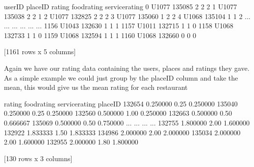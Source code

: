 \documentclass[letterpaper,10pt,english]{jupyterBook}
\begin{document}
\begin{sphinxVerbatim}[commandchars=\\\{\}]
     userID  placeID  rating  food\PYGZus{}rating  service\PYGZus{}rating
0     U1077   135085       2            2               2
1     U1077   135038       2            2               1
2     U1077   132825       2            2               2
3     U1077   135060       1            2               2
4     U1068   135104       1            1               2
...     ...      ...     ...          ...             ...
1156  U1043   132630       1            1               1
1157  U1011   132715       1            1               0
1158  U1068   132733       1            1               0
1159  U1068   132594       1            1               1
1160  U1068   132660       0            0               0

[1161 rows x 5 columns]
\end{sphinxVerbatim}

\sphinxAtStartPar
Again we have our rating data containing the users, places and ratings they gave.
As a simple example we could just group by the placeID column and take the mean, this would give us the mean rating for each restaurant

\begin{sphinxVerbatim}[commandchars=\\\{\}]
  
\end{sphinxVerbatim}

\begin{sphinxVerbatim}[commandchars=\\\{\}]
           rating  food\PYGZus{}rating  service\PYGZus{}rating
placeID                                       
132654   0.250000         0.25        0.250000
135040   0.250000         0.25        0.250000
132560   0.500000         1.00        0.250000
132663   0.500000         0.50        0.666667
135069   0.500000         0.50        0.750000
...           ...          ...             ...
132755   1.800000         2.00        1.600000
132922   1.833333         1.50        1.833333
134986   2.000000         2.00        2.000000
135034   2.000000         2.00        1.600000
132955   2.000000         1.80        1.800000

[130 rows x 3 columns]
\end{sphinxVerbatim}
\end{document}
